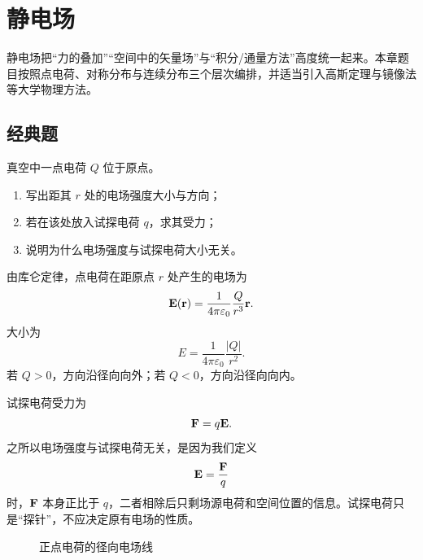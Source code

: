 \chapter{静电场}

静电场把“力的叠加”“空间中的矢量场”与“积分/通量方法”高度统一起来。本章题目按照点电荷、对称分布与连续分布三个层次编排，并适当引入高斯定理与镜像法等大学物理方法。

\section{经典题}

\begin{classic}
真空中一点电荷 $Q$ 位于原点。
\begin{enumerate}
  \item 写出距其 $r$ 处的电场强度大小与方向；
  \item 若在该处放入试探电荷 $q$，求其受力；
  \item 说明为什么电场强度与试探电荷大小无关。
\end{enumerate}
\begin{solution}
由库仑定律，点电荷在距原点 $r$ 处产生的电场为
\[
\vb{E}(\vb{r})=\frac{1}{4\pi\varepsilon_0}\frac{Q}{r^3}\vb{r}.
\]
大小为
\[
E=\frac{1}{4\pi\varepsilon_0}\frac{|Q|}{r^2}.
\]
若 $Q>0$，方向沿径向向外；若 $Q<0$，方向沿径向向内。

试探电荷受力为
\[
\vb{F}=q\vb{E}.
\]
之所以电场强度与试探电荷无关，是因为我们定义
\[
\vb{E}=\frac{\vb{F}}{q}
\]
时，$\vb{F}$ 本身正比于 $q$，二者相除后只剩场源电荷和空间位置的信息。试探电荷只是“探针”，不应决定原有电场的性质。

\begin{figure}[H]
\centering
{}
\caption{正点电荷的径向电场线}
\end{figure}
\end{solution}
\end{classic}

